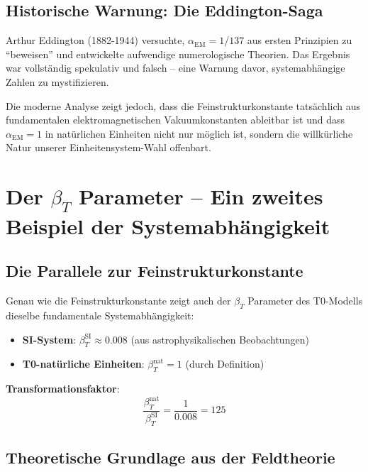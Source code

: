 \documentclass[12pt,a4paper]{article}
\begin{document}
\subsection{Historische Warnung: Die Eddington-Saga}
\label{subsec:eddington_warning}

Arthur Eddington (1882-1944) versuchte, $\alpha_{\text{EM}} = 1/137$ aus ersten Prinzipien zu ``beweisen'' und entwickelte aufwendige numerologische Theorien. Das Ergebnis war vollständig spekulativ und falsch -- eine Warnung davor, systemabhängige Zahlen zu mystifizieren.

Die moderne Analyse zeigt jedoch, dass die Feinstrukturkonstante tatsächlich aus fundamentalen elektromagnetischen Vakuumkonstanten ableitbar ist und dass $\alpha_{\text{EM}} = 1$ in natürlichen Einheiten nicht nur möglich ist, sondern die willkürliche Natur unserer Einheitensystem-Wahl offenbart.

\section{Der $\beta_T$ Parameter -- Ein zweites Beispiel der Systemabhängigkeit}
\label{sec:beta_t}

\subsection{Die Parallele zur Feinstrukturkonstante}
\label{subsec:beta_parallel}

Genau wie die Feinstrukturkonstante zeigt auch der $\beta_T$ Parameter des T0-Modells dieselbe fundamentale Systemabhängigkeit:

\begin{itemize}
	\item \textbf{SI-System}: $\beta_T^{\text{SI}} \approx 0.008$ (aus astrophysikalischen Beobachtungen)
	\item \textbf{T0-natürliche Einheiten}: $\beta_T^{\text{nat}} = 1$ (durch Definition)
\end{itemize}

\textbf{Transformationsfaktor}: 
\begin{equation}
	\frac{\beta_T^{\text{nat}}}{\beta_T^{\text{SI}}} = \frac{1}{0.008} = 125
\end{equation}

\subsection{Theoretische Grundlage aus der Feldtheorie}
\label{subsec:beta_field_theory}
\end{document}
